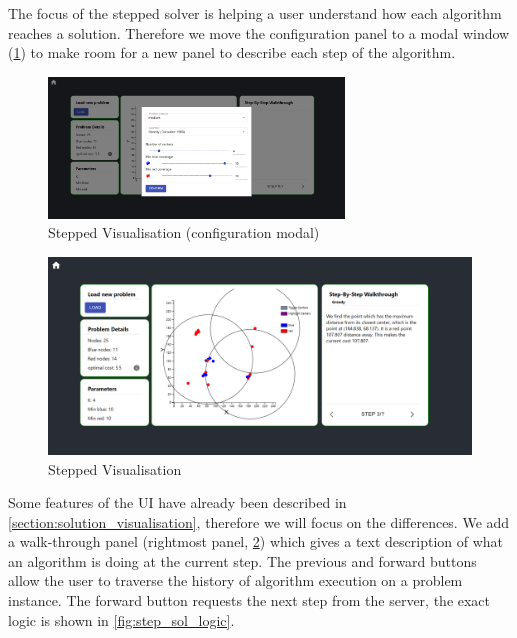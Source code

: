 The focus of the stepped solver is helping a user understand how each algorithm reaches a solution. Therefore we move the configuration panel to a modal window (\cref{fig:step_sol_modal}) to make room for a new panel to describe each step of the algorithm.

\begin{figure}[H]
    \centering
    \includegraphics[width=0.7\textwidth]{images/stepped_solver_ui/stepped_solver_modal.png}
    \caption{Stepped Visualisation (configuration modal)}
    \label{fig:step_sol_modal}
\end{figure}

\begin{figure}[H]
    \centering
    \includegraphics[width=\textwidth]{images/stepped_solver_ui/stepped_solver_greedy.png}
    \caption{Stepped Visualisation}
    \label{fig:step_sol_greedy}
\end{figure}

Some features of the UI have already been described in \cref{section:solution_visualisation}, therefore we will focus on the differences. We add a walk-through panel (rightmost panel, \cref{fig:step_sol_greedy}) which gives a text description of what an algorithm is doing at the current step. The previous and forward buttons allow the user to traverse the history of algorithm execution on a problem instance. The forward button requests the next step from the server, the exact logic is shown in \cref{fig:step_sol_logic}.

